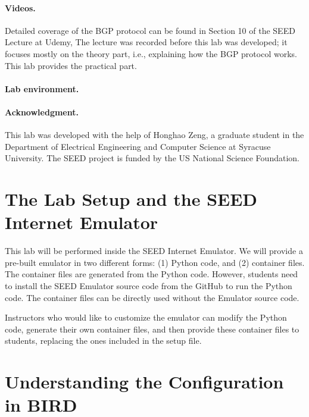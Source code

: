\paragraph{Videos.}
Detailed coverage of the BGP protocol can be found in 
Section 10 of the SEED Lecture at Udemy, \seedisvideo 
The lecture was recorded before this lab was developed; 
it focuses mostly on the theory part, i.e., explaining how the BGP protocol works. 
This lab provides the practical part.  


\paragraph{Lab environment.} 
\seedenvironmentB
\nodependency


\paragraph{Acknowledgment.} 
This lab was developed with the help of Honghao Zeng, a graduate student
in the Department of Electrical Engineering and Computer Science at Syracuse University.
The SEED project is funded by the US National Science Foundation. 


\section{The Lab Setup and the SEED Internet Emulator} 

This lab will be performed inside the SEED Internet Emulator. We will
provide a pre-built emulator in two different forms: (1) Python code,
and (2) container files. The container files are generated from
the Python code. However, students need to install the SEED Emulator source 
code from the GitHub to run the Python code. The container files
can be directly used without the Emulator source code. 

Instructors who would like to customize the emulator can modify the Python
code, generate their own container files, and then provide these
container files to students, replacing the ones included in the 
setup file. 



\section{Understanding the Configuration in BIRD} 

